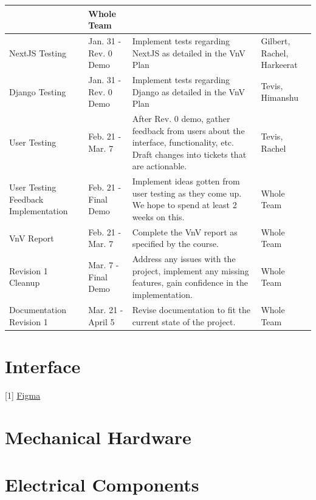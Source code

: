 \documentclass[12pt, titlepage]{article}
\begin{document}
\begin{longtable}{ p{3cm}p{3.5cm}p{5cm}p{3cm}  }
\begin{itemize}
    \end{itemize}
& Whole Team \\
 \hline
  NextJS Testing & Jan. 31 - Rev. 0 Demo & Implement tests regarding NextJS as detailed in the VnV Plan & Gilbert, Rachel, Harkeerat \\
 \hline
 Django Testing & Jan. 31 - Rev. 0 Demo & Implement tests regarding Django as detailed in the VnV Plan & Tevis, Himanshu \\
 \hline
  User Testing & Feb. 21 - Mar. 7 & After Rev. 0 demo, gather feedback from users about the interface, functionality, etc. Draft changes into tickets that are actionable. & Tevis, Rachel \\
 \hline
   User Testing Feedback Implementation & Feb. 21 - Final Demo & Implement ideas gotten from user testing as they come up. We hope to spend at least 2 weeks on this. & Whole Team \\
 \hline
 VnV Report & Feb. 21 - Mar. 7 & Complete the VnV report as specified by the course. & Whole Team \\
 \hline
 Revision 1 Cleanup & Mar. 7 - Final Demo & Address any issues with the project, implement any missing features, gain confidence in the implementation. & Whole Team \\
 \hline
 Documentation Revision 1 & Mar. 21 - April 5 & Revise documentation to fit the current state of the project. & Whole Team \\
 \hline
 
\end{longtable}

% 

\newpage{}

\appendix

\section{Interface}


[1] \href{https://www.figma.com/file/TsSCB9xRZcJgC8ZJnOhxEm/Sayyara-Automotive-Matcher-w\%2F-Template?node-id=6690\%3A116&t=meQ7BcozE7pEMGGX-1}{Figma}
\section{Mechanical Hardware}

\section{Electrical Components}
\end{document}
